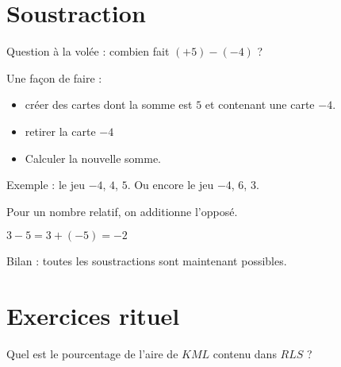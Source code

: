 \section{Soustraction}

Question à la volée : combien fait \( (+5)-(-4)  \) ?

Une façon de faire : 
\begin{itemize}
    \item 
créer des cartes dont la somme est \( 5\) et contenant une carte \( -4\).
\item
    retirer la carte \( -4\)
\item 
    Calculer la nouvelle somme.
\end{itemize}
Exemple : le jeu \( -4\), \( 4\), \( 5\). Ou encore le jeu \( -4\), \( 6\), \( 3\).


\begin{definition}
    Pour  un nombre relatif, on additionne l'opposé.
\end{definition}

\begin{example}
    \( 3-5=3+(-5)=-2\)
\end{example}

Bilan : toutes les soustractions sont maintenant possibles.


\section{Exercices rituel}

\newpage

\thispagestyle{empty}

\vphantom{A}
\vspace{2cm}

\begin{center}
    
\end{center}

Quel est le pourcentage de l'aire de \( KML\) contenu dans \( RLS\) ?

\newpage


